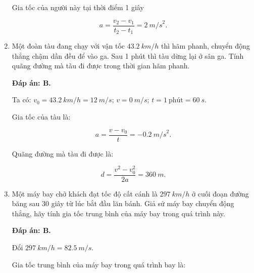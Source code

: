 \begin{enumerate}[label=\bfseries Câu \arabic*:]
{		Gia tốc của người này tại thời điểm 1 giây
		
		$$a = \dfrac{v_2 - v_1}{t_2 - t_1} = \SI{2}{m/s}^2.$$
		
	}
		\item {}
	
	
	{Một đoàn tàu đang chạy với vận tốc $\SI{43,2}{km/h}$ thì hãm phanh, chuyển động thẳng chậm dần đều để vào ga. Sau 1 phút thì tàu dừng lại ở sân ga. Tính quãng đường mà tàu đi được trong thời gian hãm phanh.
	
	
		
	}
	
	\hideall
	{\textbf{Đáp án: B.}
		
		Ta có: $v_0 = \SI{43,2}{km/h} = \SI{12}{m/s}$; $v = \SI{0}{m/s}$; $t = 1\ \text{phút} = \SI{60}{s}$.
		
		Gia tốc của tàu là:
		
		$$a = \dfrac{v - v_0}{t} = -\SI{0,2}{m/s}^2.$$
		
		Quãng đường mà tàu đi được là:
		
		$$d = \dfrac{v^2 - v_0^2}{2a} = \SI{360}{m}.$$
		
	}
	
	\item {}
	
	
	{Một máy bay chở khách đạt tốc độ cất cánh là $\SI{297}{km/h}$ ở cuối đoạn đường băng sau 30 giây từ lúc bắt đầu lăn bánh. Giả sử máy bay chuyển động thẳng, hãy tính gia tốc trung bình của máy bay trong quá trình này.
		

		
	}
	
	\hideall
	{\textbf{Đáp án: B.}
		
		Đổi $\SI{297}{km/h} = \SI{82,5}{m/s}.$
		
		Gia tốc trung bình của máy bay trong quá trình bay là:
		
}
\end{enumerate}
